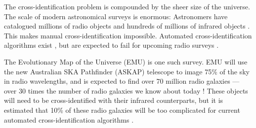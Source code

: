 
The cross-identification problem is compounded by the sheer size of the
universe. The scale of modern astronomical surveys is enormous: Astronomers
have catalogued millions of radio objects \citep{banfield15} and hundreds of
millions of infrared objects \citep{cutri13}. This makes manual
cross-identification impossible. Automated cross-identification algorithms
exist \citep{proctor06, fan15}, but are expected to fail for upcoming radio
surveys \citep{banfield15}.

The Evolutionary Map of the Universe (EMU) \citep{norris11} is one such survey.
EMU will use the new Australian SKA Pathfinder (ASKAP) telescope to image 75\%
of the sky in radio wavelengths, and is expected to find over 70 million radio
galaxies --- over 30 times the number of radio galaxies we know about today
\citep{banfield15}! These objects will need to be cross-identified with their
infrared counterparts, but it is estimated that 10\% of these radio galaxies
will be too complicated for current automated cross-identification algorithms
\citep{banfield15, norris11}.



